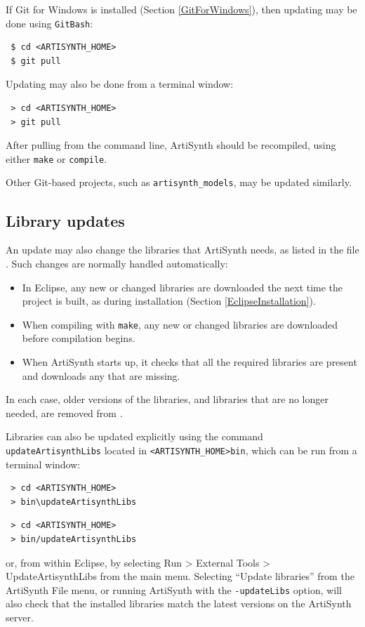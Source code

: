 \ifWindows
If Git for Windows is installed (Section \ref{GitForWindows}),
then updating may be done using {\tt GitBash}:
\begin{verbatim}
 $ cd <ARTISYNTH_HOME>
 $ git pull
\end{verbatim}
\else %
Updating may also be done from a terminal window: 
\begin{verbatim}
 > cd <ARTISYNTH_HOME>
 > git pull
\end{verbatim}
\fi %
After pulling from the command line, ArtiSynth should be recompiled,
using either {\tt make} or {\tt compile}.

Other Git-based projects, such as {\tt artisynth\_models}, may be
updated similarly.

\subsection{Library updates}

An update may also change the libraries that ArtiSynth needs, as
listed in the file . Such changes
are normally handled automatically:

\begin{itemize}

\item In Eclipse, any new or changed libraries are downloaded the
next time the project is built, as during installation
(Section \ref{EclipseInstallation}).

\item When compiling with {\tt make}, any new or changed libraries
are downloaded before compilation begins.

\item When ArtiSynth starts up, it checks that all the required
libraries are present and downloads any that are missing.

\end{itemize}

In each case, older versions of the libraries, and libraries that are
no longer needed, are removed from .

Libraries can also be updated explicitly using the command {\tt
updateArtisynthLibs} located in {\tt <ARTISYNTH\_HOME>\SEP bin}, which
can be run from a terminal window:
\ifWindows
\begin{verbatim}
 > cd <ARTISYNTH_HOME>
 > bin\updateArtisynthLibs
\end{verbatim}
\else
\begin{verbatim}
 > cd <ARTISYNTH_HOME>
 > bin/updateArtisynthLibs
\end{verbatim}
\fi
or, from within Eclipse, by selecting {\sf Run > External Tools >
UpdateArtisynthLibs} from the main menu. Selecting {\sf ``Update
libraries''} from the ArtiSynth {\sf File} menu, or running ArtiSynth
with the {\tt -updateLibs} option, will also check that the installed
libraries match the latest versions on the ArtiSynth server.

